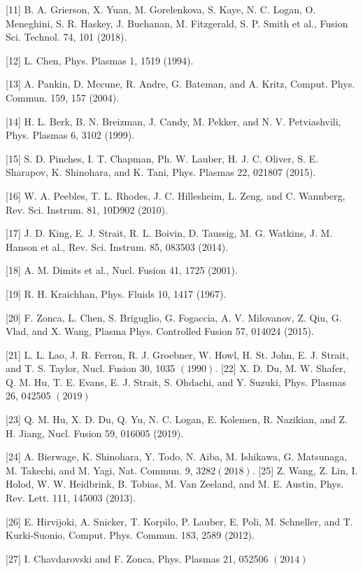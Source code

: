 \documentclass[oneside,onecolumn]{article}
\begin{document}
\begin{sloppypar}
 [11] B. A. Grierson, X. Yuan, M. Gorelenkova, S. Kaye, N. C. Logan, O. Meneghini, S. R. Haskey, J. Buchanan, M. Fitzgerald, S. P. Smith et al., Fusion Sci. Technol. 74, 101 (2018).
 
 [12] L. Chen, Phys. Plasmas 1, 1519 (1994).
 
 [13] A. Pankin, D. Mccune, R. Andre, G. Bateman, and A. Kritz, Comput. Phys. Commun. 159, 157 (2004).
 
 [14] H. L. Berk, B. N. Breizman, J. Candy, M. Pekker, and N. V. Petviashvili, Phys. Plasmas 6, 3102 (1999).
 
 [15] S. D. Pinches, I. T. Chapman, Ph. W. Lauber, H. J. C. Oliver, S. E. Sharapov, K. Shinohara, and K. Tani, Phys. Plasmas 22, 021807 (2015).
 
 [16] W. A. Peebles, T. L. Rhodes, J. C. Hillesheim, L. Zeng, and C. Wannberg, Rev. Sci. Instrum. 81, 10D902 (2010).
 
 [17] J. D. King, E. J. Strait, R. L. Boivin, D. Taussig, M. G. Watkins, J. M. Hanson et al., Rev. Sci. Instrum. 85, 083503 (2014).
 
 [18] A. M. Dimits et al., Nucl. Fusion 41, 1725 (2001).
 
 [19] R. H. Kraichhan, Phys. Fluids 10, 1417 (1967).
 
 [20] F. Zonca, L. Chen, S. Briguglio, G. Fogaccia, A. V. Milovanov, Z. Qiu, G. Vlad, and X. Wang, Plasma Phys. Controlled Fusion 57, 014024 (2015).
 
 [21] L. L. Lao, J. R. Ferron, R. J. Groebner, W. Howl, H. St. John, E. J. Strait, and T. S. Taylor, Nucl. Fusion 30, 1035 $(1990)$. [22] X. D. Du, M. W. Shafer, Q. M. Hu, T. E. Evans, E. J. Strait, S. Ohdachi, and Y. Suzuki, Phys. Plasmas 26, 042505 $(2019)$
 
 [23] Q. M. Hu, X. D. Du, Q. Yu, N. C. Logan, E. Kolemen, R. Nazikian, and Z. H. Jiang, Nucl. Fusion 59, 016005 (2019).
 
 [24] A. Bierwage, K. Shinohara, Y. Todo, N. Aiba, M. Ishikawa, G. Matsunaga, M. Takechi, and M. Yagi, Nat. Commun. 9, $3282(2018)$. [25] Z. Wang, Z. Lin, I. Holod, W. W. Heidbrink, B. Tobias, M. Van Zeeland, and M. E. Austin, Phys. Rev. Lett. 111, 145003 (2013).
 
 [26] E. Hirvijoki, A. Snicker, T. Korpilo, P. Lauber, E. Poli, M. Schneller, and T. Kurki-Suonio, Comput. Phys. Commun. 183, 2589 (2012).
 
 [27] I. Chavdarovski and F. Zonca, Phys. Plasmas 21, 052506 $(2014)$
 
 \end{sloppypar}	
 
\end{document}
